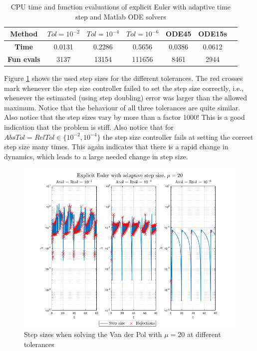\begin{table}[H]
    \centering
    \caption{CPU time and function evaluations of explicit Euler with adaptive time step and Matlab ODE solvers}
    \begin{tabular}{|c||c|c|c|c|c|c|} \hline
         \textbf{Method}    & $Tol = 10^{-2}$&   $Tol = 10^{-4}$ & $Tol = 10^{-6}$ & ODE45 & ODE15s     \\ \hline \hline 
         \textbf{Time}      & 0.0131  &  0.2286  &  0.5656 & 0.0386 & 0.0612   \\ \hline
         \textbf{Fun evals} & 3137   &    13154  &    111656 & 8461 & 2944  \\ \hline
    \end{tabular}
    \label{tab2:mu20_adap}
\end{table}

Figure \ref{fig2:adap_mu20_h} shows the used step sizes for the different tolerances. The red crosses mark whenever the step size controller failed to set the step size correctly, i.e., whenever the estimated (using step doubling) error was larger than the allowed maximum. Notice that the behaviour of all three tolerances are quite similar. Also notice that the step sizes vary by more than a factor 1000! This is a good indication that the problem is stiff. Also notice that for $AbsTol=RelTol \in \{10^{-2}, 10^{-4}\}$ the step size controller fails at setting the correct step size many times. This again indicates that there is a rapid change in dynamics, which leads to a large needed change in step size.

\begin{figure}[H]
    \centering
    \includegraphics[width=\textwidth]{graphics/opg2/mu20_h.png}
    \caption{Step sizes when solving the Van der Pol with $\mu = 20$ at different tolerances}
    \label{fig2:adap_mu20_h}
\end{figure}





